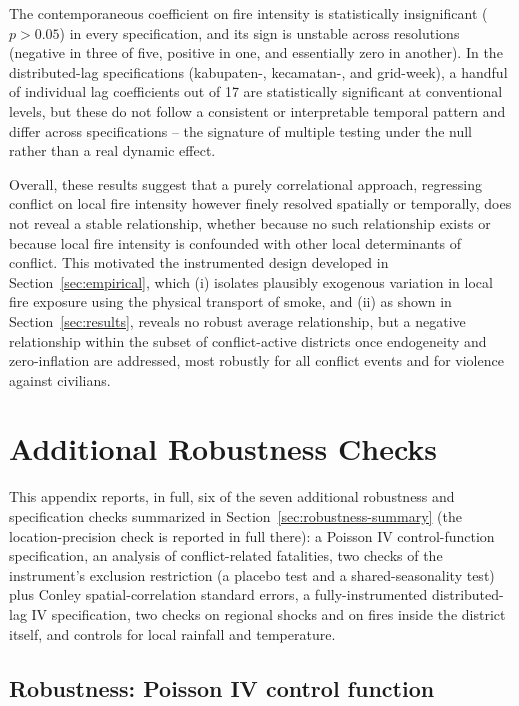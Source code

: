 \documentclass[12pt]{article}
\begin{document}
The contemporaneous coefficient on fire intensity is statistically insignificant ($p > 0.05$) in every specification, and its sign is unstable across resolutions (negative in three of five, positive in one, and essentially zero in another). In the distributed-lag specifications (kabupaten-, kecamatan-, and grid-week), a handful of individual lag coefficients out of 17 are statistically significant at conventional levels, but these do not follow a consistent or interpretable temporal pattern and differ across specifications -- the signature of multiple testing under the null rather than a real dynamic effect.

Overall, these results suggest that a purely correlational approach, regressing conflict on local fire intensity however finely resolved spatially or temporally, does not reveal a stable relationship, whether because no such relationship exists or because local fire intensity is confounded with other local determinants of conflict. This motivated the instrumented design developed in Section~\ref{sec:empirical}, which (i) isolates plausibly exogenous variation in local fire exposure using the physical transport of smoke, and (ii) as shown in Section~\ref{sec:results}, reveals no robust average relationship, but a negative relationship within the subset of conflict-active districts once endogeneity and zero-inflation are addressed, most robustly for all conflict events and for violence against civilians.

\section{Additional Robustness Checks}
\label{sec:appendixrobustness}

This appendix reports, in full, six of the seven additional robustness and specification checks summarized in Section~\ref{sec:robustness-summary} (the location-precision check is reported in full there): a Poisson IV control-function specification, an analysis of conflict-related fatalities, two checks of the instrument's exclusion restriction (a placebo test and a shared-seasonality test) plus Conley spatial-correlation standard errors, a fully-instrumented distributed-lag IV specification, two checks on regional shocks and on fires inside the district itself, and controls for local rainfall and temperature.

\subsection{Robustness: Poisson IV control function}
\label{sec:poisson}
\end{document}
